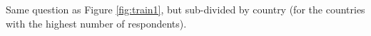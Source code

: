 \label{fig:train3}

Same question as Figure \ref{fig:train1}, but sub-divided by country (for the countries with the highest number of respondents).